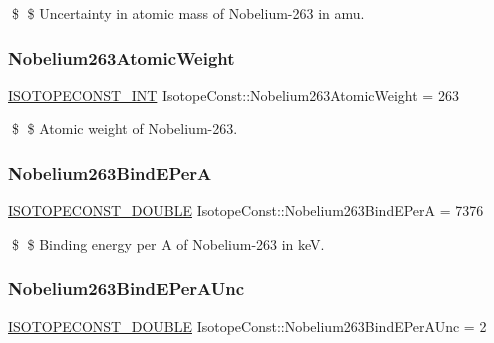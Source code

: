 \$ \$ Uncertainty in atomic mass of Nobelium-\/263 in amu. \mbox{\label{group___isotope_const-_nobelium-_no263_ga91f92e14a512138d7ae864bbab7fe4e2}} 
\subsubsection{\texorpdfstring{Nobelium263\+Atomic\+Weight}{Nobelium263AtomicWeight}}
{\footnotesize\ttfamily \mbox{\hyperlink{group___isotope_const-_macros_ga5f18360b3e99483a35c32d789e62621c}{I\+S\+O\+T\+O\+P\+E\+C\+O\+N\+S\+T\+\_\+\+I\+NT}} Isotope\+Const\+::\+Nobelium263\+Atomic\+Weight = 263}

\$ \$ Atomic weight of Nobelium-\/263. \mbox{\label{group___isotope_const-_nobelium-_no263_gad5c28558542b79dc7d5c902259d670a7}} 
\subsubsection{\texorpdfstring{Nobelium263\+Bind\+E\+PerA}{Nobelium263BindEPerA}}
{\footnotesize\ttfamily \mbox{\hyperlink{group___isotope_const-_macros_ga8f45a7272ce02c0b4c65c44636ed719a}{I\+S\+O\+T\+O\+P\+E\+C\+O\+N\+S\+T\+\_\+\+D\+O\+U\+B\+LE}} Isotope\+Const\+::\+Nobelium263\+Bind\+E\+PerA = 7376}

\$ \$ Binding energy per A of Nobelium-\/263 in keV. \mbox{\label{group___isotope_const-_nobelium-_no263_ga5e59d8dbdc8d47590b82cbaf2c362b3d}} 
\subsubsection{\texorpdfstring{Nobelium263\+Bind\+E\+Per\+A\+Unc}{Nobelium263BindEPerAUnc}}
{\footnotesize\ttfamily \mbox{\hyperlink{group___isotope_const-_macros_ga8f45a7272ce02c0b4c65c44636ed719a}{I\+S\+O\+T\+O\+P\+E\+C\+O\+N\+S\+T\+\_\+\+D\+O\+U\+B\+LE}} Isotope\+Const\+::\+Nobelium263\+Bind\+E\+Per\+A\+Unc = 2}

